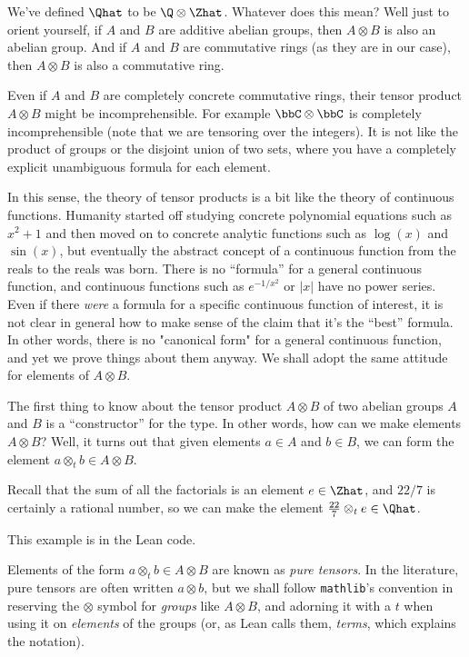 We've defined $\Qhat$ to be $\Q\otimes\Zhat$. Whatever does this mean? Well just to orient yourself,
if $A$ and $B$ are additive abelian groups, then $A\otimes B$ is also an abelian group.
And if $A$ and $B$ are commutative rings (as they are in our case), then $A\otimes B$ is also
a commutative ring.

Even if $A$ and $B$ are completely concrete commutative rings, their tensor product $A\otimes B$
might be incomprehensible. For example $\bbC\otimes\bbC$ is completely incomprehensible (note that we are
tensoring over the integers). It is not like the product of groups or the disjoint union of
two sets, where you have a completely explicit unambiguous formula for each element.

In this sense, the theory of tensor products is a bit like the theory of continuous functions.
Humanity started off studying concrete polynomial equations such as $x^2+1$ and then moved on to
concrete analytic functions such as $\log(x)$ and $\sin(x)$, but eventually the abstract concept
of a continuous function from the reals to the reals was born. There is no ``formula'' for a general
continuous function, and continuous functions such as $e^{-1/x^2}$ or $|x|$ have no power series.
Even if there \emph{were} a formula for a specific continuous function of interest, it is not clear
in general how to make sense of the claim that it's the ``best'' formula. In other words, there is
no "canonical form" for a general continuous function, and yet we prove things about them anyway.
We shall adopt the same attitude for elements of $A\otimes B$.

The first thing to know about the tensor product $A\otimes B$ of two abelian groups $A$ and $B$
is a ``constructor'' for the type. In other words, how can we make elements $A\otimes B$?
Well, it turns out that given elements $a\in A$ and $b\in B$, we can form the element
$a\otimes_t b\in A\otimes B$.

\begin{example} Recall that the sum of all the factorials is an element $e\in\Zhat$, and $22/7$ is certainly
a rational number, so we can make the element $\frac{22}{7}\otimes_te\in\Qhat$.
\end{example}

This example is in the Lean code.

Elements of the form $a\otimes_t b\in A\otimes B$ are known as \emph{pure tensors}. In the
literature, pure tensors
are often written $a\otimes b$, but we shall follow {\tt mathlib}'s convention in reserving
the $\otimes$ symbol for \emph{groups} like $A \otimes B$, and adorning it with a $t$ when
using it on \emph{elements} of the groups (or, as Lean calls them, \emph{terms}, which explains
the notation).

